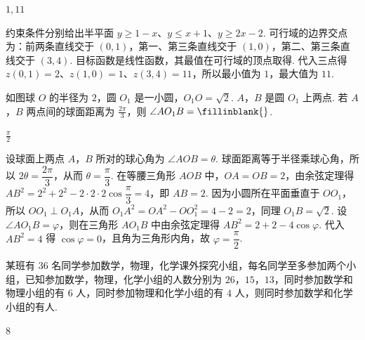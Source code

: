 \begin{answer}
\(1,11\)
\end{answer}

\begin{solution}
约束条件分别给出半平面 \(y\geqslant1-x\)、\(y\leqslant x+1\)、\(y\geqslant2x-2\). 可行域的边界交点为：前两条直线交于 \((0,1)\)，第一、第三条直线交于 \((1,0)\)，第二、第三条直线交于 \((3,4)\). 目标函数是线性函数，其最值在可行域的顶点取得. 代入三点得 \(z(0,1)=2\)、\(z(1,0)=1\)、\(z(3,4)=11\)，所以最小值为 \(1\)，最大值为 \(11\).
\end{solution}

\begin{problem}
如图球 \(O\) 的半径为 \(2\)，圆 \(O_{1}\) 是一小圆，\(O_{1}O = \sqrt{2}\). \(A\)，\(B\) 是圆 \(O_{1}\) 上两点. 若 \(A\)，\(B\) 两点间的球面距离为 \(\frac{2\pi}{3}\)，则 \(\angle AO_{1}B =\fillinblank{}\).

\end{problem}

\begin{answer}
\(\frac{\pi}{2}\)
\end{answer}

\begin{solution}
设球面上两点 \(A\)，\(B\) 所对的球心角为 \(\angle AOB=\theta\). 球面距离等于半径乘球心角，所以 \(2\theta=\dfrac{2\pi}{3}\)，从而 \(\theta=\dfrac{\pi}{3}\). 在等腰三角形 \(AOB\) 中，\(OA=OB=2\)，由余弦定理得 \(AB^{2}=2^{2}+2^{2}-2\cdot2\cdot2\cos\dfrac{\pi}{3}=4\)，即 \(AB=2\). 因为小圆所在平面垂直于 \(OO_{1}\)，所以 \(OO_{1}\perp O_{1}A\)，从而 \(O_{1}A^{2}=OA^{2}-OO_{1}^{2}=4-2=2\)，同理 \(O_{1}B=\sqrt{2}\). 设 \(\angle AO_{1}B=\varphi\)，则在三角形 \(AO_{1}B\) 中由余弦定理得 \(AB^{2}=2+2-4\cos\varphi\). 代入 \(AB^{2}=4\) 得 \(\cos\varphi=0\)，且角为三角形内角，故 \(\varphi=\dfrac{\pi}{2}\).
\end{solution}

\begin{problem}
某班有 \(36\) 名同学参加数学，物理，化学课外探究小组，每名同学至多参加两个小组，已知参加数学，物理，化学小组的人数分别为 \(26\)，\(15\)，\(13\)，同时参加数学和物理小组的有 \(6\) 人，同时参加物理和化学小组的有 \(4\) 人，则同时参加数学和化学小组的有\fillinblank{}人.
\end{problem}

\begin{answer}
8
\end{answer}

